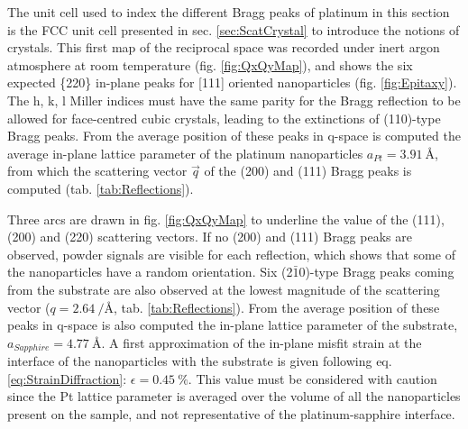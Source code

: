 The unit cell used to index the different Bragg peaks of platinum in this section is the FCC unit cell presented in sec. \ref{sec:ScatCrystal} to introduce the notions of crystals.
This first map of the reciprocal space was recorded under inert argon atmosphere at room temperature (fig. \ref{fig:QxQyMap}), and shows the six expected \{220\} in-plane peaks for [111] oriented nanoparticles (fig. \ref{fig:Epitaxy}).
The h, k, l Miller indices must have the same parity for the Bragg reflection to be allowed for face-centred cubic crystals, leading to the extinctions of (110)-type Bragg peaks.
From the average position of these peaks in q-space is computed the average in-plane lattice parameter of the platinum nanoparticles $a_{Pt}=\qty{3.91}{\angstrom}$, from which the scattering vector $\vec{q}$ of the (200) and (111) Bragg peaks is computed (tab. \ref{tab:Reflections}).

Three arcs are drawn in fig. \ref{fig:QxQyMap} to underline the value of the (111), (200) and (220) scattering vectors.
If no (200) and (111) Bragg peaks are observed, powder signals are visible for each reflection, which shows that some of the nanoparticles have a random orientation.
Six (2$\bar{1}$0)-type Bragg peaks coming from the  substrate are also observed at the lowest magnitude of the scattering vector ($q = \qty{2.64}{\per\angstrom}$, tab. \ref{tab:Reflections}).
From the average position of these peaks in q-space is also computed the in-plane lattice parameter of the substrate, $a_{Sapphire}=\qty{4.77}{\angstrom}$.
A first approximation of the in-plane misfit strain at the interface of the nanoparticles with the substrate is given following eq. \ref{eq:StrainDiffraction}: $\epsilon = \qty{0.45}{\percent}$.
This value must be considered with caution since the Pt lattice parameter is averaged over the volume of all the nanoparticles present on the sample, and not representative of the platinum-sapphire interface.

